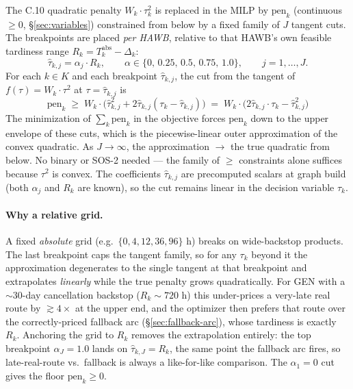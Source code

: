 \documentclass[11pt,a4paper]{article}
\theoremstyle{definition}
\begin{document}
The C.10 quadratic penalty $W_k \cdot \tau_k^2$ is replaced in the MILP by
$\text{pen}_k$ (continuous $\geq 0$, \S\ref{sec:variables}) constrained from
below by a fixed family of $J$ tangent cuts. The breakpoints are placed
\emph{per HAWB}, relative to that HAWB's own feasible tardiness range
$R_k = T_k^{\text{abs}} - \Delta_k$:
\begin{equation*}
  \hat\tau_{k,j} = \alpha_j \cdot R_k,
  \qquad \alpha \in \{0,\, 0.25,\, 0.5,\, 0.75,\, 1.0\},
  \qquad j = 1, \ldots, J.
\end{equation*}
For each $k \in K$ and each breakpoint $\hat\tau_{k,j}$, the cut from the
tangent of $f(\tau) = W_k \cdot \tau^2$ at $\tau = \hat\tau_{k,j}$ is
\begin{equation}
  \text{pen}_k \;\geq\; W_k \cdot \bigl(\hat\tau_{k,j}^2 + 2\hat\tau_{k,j} (\tau_k - \hat\tau_{k,j})\bigr)
            \;=\; W_k \cdot \bigl(2\hat\tau_{k,j} \cdot \tau_k - \hat\tau_{k,j}^2\bigr)
  \label{eq:lin-tardiness}
\end{equation}
The minimization of $\sum_k \text{pen}_k$ in the objective forces
$\text{pen}_k$ down to the upper envelope of these cuts, which is the
piecewise-linear outer approximation of the convex quadratic. As $J \to
\infty$, the approximation $\to$ the true quadratic from below. No binary or
SOS-2 needed --- the family of $\geq$ constraints alone suffices because
$\tau^2$ is convex. The coefficients $\hat\tau_{k,j}$ are precomputed scalars
at graph build (both $\alpha_j$ and $R_k$ are known), so the cut remains
linear in the decision variable $\tau_k$.

\paragraph{Why a relative grid.}
A fixed \emph{absolute} grid (e.g.\ $\{0,4,12,36,96\}$ h) breaks on
wide-backstop products. The last breakpoint caps the tangent family, so for
any $\tau_k$ beyond it the approximation degenerates to the single tangent at
that breakpoint and extrapolates \emph{linearly} while the true penalty grows
quadratically. For GEN with a $\sim$30-day cancellation backstop ($R_k \sim
720$ h) this under-prices a very-late real route by $\gtrsim 4\times$ at the
upper end, and the optimizer then prefers that route over the
correctly-priced fallback arc (\S\ref{sec:fallback-arc}), whose tardiness is
exactly $R_k$. Anchoring the grid to $R_k$ removes the extrapolation
entirely: the top breakpoint $\alpha_J = 1.0$ lands on $\hat\tau_{k,J} = R_k$,
the same point the fallback arc fires, so late-real-route vs.\ fallback is
always a like-for-like comparison. The $\alpha_1 = 0$ cut gives the floor
$\text{pen}_k \geq 0$.
\end{document}
